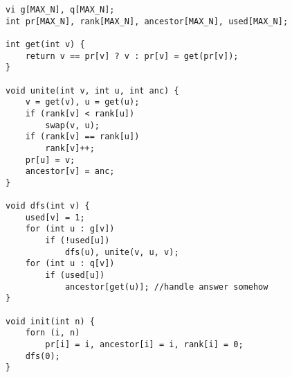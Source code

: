 \begin{verbatim}
vi g[MAX_N], q[MAX_N];
int pr[MAX_N], rank[MAX_N], ancestor[MAX_N], used[MAX_N];

int get(int v) {
	return v == pr[v] ? v : pr[v] = get(pr[v]);
}

void unite(int v, int u, int anc) {
	v = get(v), u = get(u);
	if (rank[v] < rank[u])
		swap(v, u);
	if (rank[v] == rank[u])
		rank[v]++;
	pr[u] = v;
	ancestor[v] = anc; 	
}

void dfs(int v) {
	used[v] = 1;
	for (int u : g[v])
		if (!used[u])
			dfs(u), unite(v, u, v);
	for (int u : q[v])
		if (used[u])
			ancestor[get(u)]; //handle answer somehow
}

void init(int n) {
	forn (i, n)
		pr[i] = i, ancestor[i] = i, rank[i] = 0;			
	dfs(0);
}
\end{verbatim}

